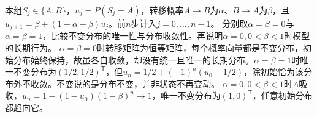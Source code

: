 本组\(S_j\in\{A,B\}\)，\(u_j=P(S_j=A)\)，转移概率\(A\to B\)为\(\alpha\)、\(B\to A\)为\(\beta\)，且\(u_{j+1}=\beta+(1-\alpha-\beta)u_j\)。前\(n\)步计入\(j=0,\ldots,n-1\)。
分别取\(\alpha=\beta=0\)与\(\alpha=\beta=1\)，比较不变分布的唯一性与分布收敛性。再说明\(\alpha=0,0<\beta<1\)时模型的长期行为。
\solutionanswer
\(\alpha=\beta=0\)时转移矩阵为恒等矩阵，每个概率向量都是不变分布，初始分布始终保持，故虽各自收敛，却没有统一且唯一的长期分布。\(\alpha=\beta=1\)时唯一不变分布为\((1/2,1/2)^{\mathsf T}\)，但\(u_n=1/2+(-1)^n(u_0-1/2)\)，除初始恰为该分布外不收敛。不变说的是分布不变，并非状态不再变动。
\(\alpha=0,0<\beta<1\)时\(A\)吸收，\(u_n=1-(1-u_0)(1-\beta)^n\to1\)，唯一不变分布为\((1,0)^{\mathsf T}\)，任意初始分布都趋向它。
\par
